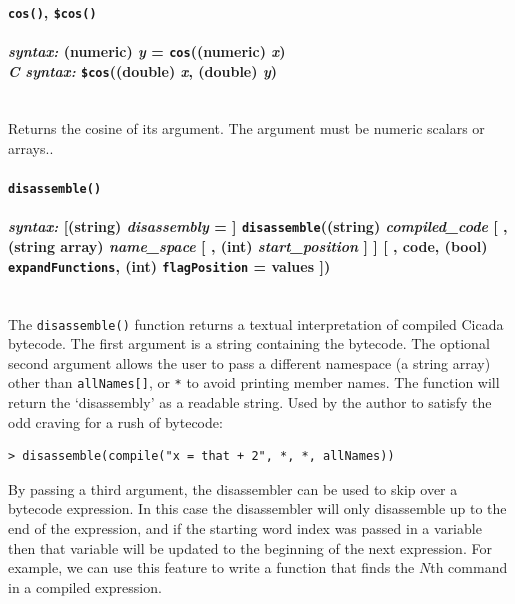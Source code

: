 \documentclass{article}
\newenvironment{code}{
       \begin{list}{}{
               \setlength{\leftmargin}{.4in}
               \setlength{\rightmargin}{0in}
               \setlength{\topsep}{.2in}
       }
       \small
       \item[] }
       { \end{list}   }
\begin{document}

\paragraph{\texttt{cos()}, \texttt{\$cos()}\\\\
\normalfont \emph{syntax: } (numeric) \emph{y} = \texttt{cos}((numeric) \emph{x})\\
\normalfont \emph{C syntax: } \texttt{\$cos}((double) \emph{x}, (double) \emph{y})\\\\}

Returns the cosine of its argument.  The argument must be numeric scalars or arrays..\\

 



\paragraph{\texttt{disassemble()}\\\\  
\normalfont \emph{syntax: } [(string) \emph{disassembly} = ] \texttt{disassemble}((string) \emph{compiled\_code} [ , (string array) \emph{name\_space} [ , (int) \emph{start\_position} ] ] [ , code, (bool) \texttt{expandFunctions}, (int) \texttt{flagPosition} = values ])\\\\}

The \texttt{disassemble()} function returns a textual interpretation of compiled Cicada bytecode.  The first argument is a string containing the bytecode.  The optional second argument allows the user to pass a different namespace (a string array) other than \verb#allNames[]#, or \verb#*# to avoid printing member names.  The function will return the `disassembly' as a readable string.  Used by the author to satisfy the odd craving for a rush of bytecode:

\begin{code} \begin{verbatim}
> disassemble(compile("x = that + 2", *, *, allNames))
\end{verbatim} \end{code}

By passing a third argument, the disassembler can be used to skip over a bytecode expression.  In this case the disassembler will only disassemble up to the end of the expression, and if the starting word index was passed in a variable then that variable will be updated to the beginning of the next expression.  For example, we can use this feature to write a function that finds the $N$th command in a compiled expression.
\end{document}
